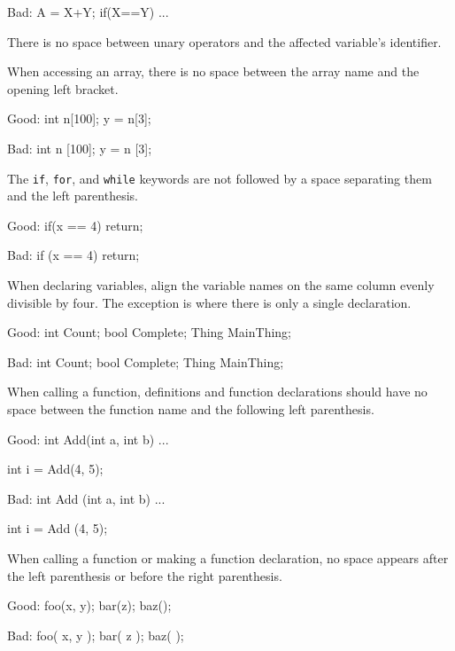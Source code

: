 Bad:
\startCodeExample
A = X+Y;
if(X==Y)
    ...
\stopCodeExample

\item
There is no space between unary operators and the affected variable's identifier.

\item
When accessing an array, there is no space between the array name and the opening left bracket. 

Good:
\startCodeExample
int n[100];
y = n[3];
\stopCodeExample

Bad:
\startCodeExample
int n [100];
y = n [3];
\stopCodeExample

\item
The {\tt if}, {\tt for}, and {\tt while} keywords are not followed by a space separating them and the left parenthesis. 

Good:
\startCodeExample
if(x == 4)
    return;
\stopCodeExample

Bad:
\startCodeExample
if (x == 4)
    return;
\stopCodeExample

\item
When declaring variables, align the variable names on the same column evenly divisible by four. The exception is where there is only a single declaration.

Good:
\startCodeExample
int     Count;
bool    Complete;
Thing   MainThing;
\stopCodeExample

Bad:
\startCodeExample
int Count;
bool Complete;
Thing MainThing;
\stopCodeExample

\item
When calling a function, definitions and function declarations should have no space between the function name and the following left parenthesis.

Good:
\startCodeExample
int Add(int a, int b)
{ 
    ... 
}

int i = Add(4, 5);
\stopCodeExample

Bad:
\startCodeExample
int Add (int a, int b)
{
    ...
}

int i = Add (4, 5);
\stopCodeExample

\item
When calling a function or making a function declaration, no space appears after the left parenthesis or before the right parenthesis.

Good:
\startCodeExample
foo(x, y);
bar(z);
baz();
\stopCodeExample

Bad:
\startCodeExample
foo( x, y );
bar( z );
baz( );
\stopCodeExample

